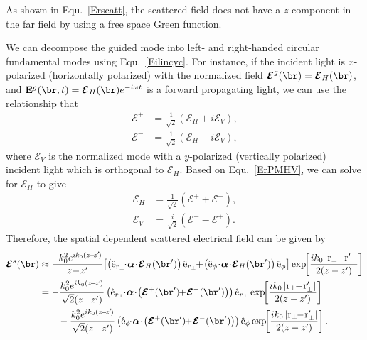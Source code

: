 As shown in Equ.~\ref{Erscatt}, the scattered field does not have a $ z $-component in the far field by using a free space Green function. 

We can decompose the guided mode into left- and right-handed circular fundamental modes using Equ.~\ref{Eilincyc}. For instance, if the incident light is $ x $-polarized (horizontally polarized) with the normalized field $ \boldsymbol{\mathcal{E}}^g (\br)=\boldsymbol{\mathcal{E}}_H (\br) $, and $ \mathbf{E}^g (\br,t) = \boldsymbol{\mathcal{E}}_H(\br)e^{-i\omega t} $ is a forward propagating light, we can use the relationship that
\begin{subequations}
\label{ErPMHV}
\begin{align}
\boldsymbol{\mathcal{E}}^+ &= \frac{1}{\sqrt{2}} \left(\boldsymbol{\mathcal{E}}_H+i\boldsymbol{\mathcal{E}}_V \right),\\
\boldsymbol{\mathcal{E}}^- &= \frac{1}{\sqrt{2}} \left( \boldsymbol{\mathcal{E}}_H-i\boldsymbol{\mathcal{E}}_V \right),
\end{align}
\end{subequations}
where $ \boldsymbol{\mathcal{E}}_V $ is the normalized mode with a $ y $-polarized (vertically polarized) incident light which is orthogonal to $ \boldsymbol{\mathcal{E}}_H $. Based on Equ.~\ref{ErPMHV}, we can solve for $ \boldsymbol{\mathcal{E}}_H $ to give
\begin{align}
\boldsymbol{\mathcal{E}}_H &= \frac{1}{\sqrt{2}} \left(\boldsymbol{\mathcal{E}}^+ + \boldsymbol{\mathcal{E}}^- \right),\\
\boldsymbol{\mathcal{E}}_V &= \frac{i}{\sqrt{2}} \left( \boldsymbol{\mathcal{E}}^- -\boldsymbol{\mathcal{E}}^+ \right). 
\end{align}
Therefore, the spatial dependent scattered electrical field can be given by
\begin{align}
\boldsymbol{\mathcal{E}}^s(\br) &\approx  \frac{-\!k_0^2 e^{ik_0(z\!-\!z'\!)}}{z\!-\!z'}\! \left[\left(\hat{\mathrm{e}}_{r_\perp} \!\!\cdot\! \boldsymbol{\alpha}\!\cdot\! \boldsymbol{\mathcal{E}}_H(\br')\right)\hat{\mathrm{e}}_{r_\perp} \!\!  +\! \left(\hat{\mathrm{e}}_\phi\!\cdot\! \boldsymbol{\alpha}\!\cdot\! \boldsymbol{\mathcal{E}}_H(\br') \right)\hat{\mathrm{e}}_\phi \right] \exp\!\! \left[ \frac{ik_0 \left| \mathrm{r}_\perp\!\! -\! \mathrm{r}_\perp'\right|}{2(z-z')}  \right]\\
&= - \frac{k_0^2 e^{ik_0(z\!-\!z'\!)}}{\sqrt{2}(z\!-\!z')} \left(\hat{\mathrm{e}}_{r_\perp} \!\!\cdot\! \boldsymbol{\alpha}\!\cdot\! \left(\boldsymbol{\mathcal{E}}^+ (\br') \!\! +\! \boldsymbol{\mathcal{E}}^- (\br') \right)\right)\hat{\mathrm{e}}_{r_\perp}  \exp\!\! \left[ \frac{ik_0 \left| \mathrm{r}_\perp\!\! -\! \mathrm{r}_\perp'\right|}{2(z-z')}  \right] \nonumber\\
&\qquad - \frac{k_0^2 e^{ik_0(z\!-\!z'\!)}}{\sqrt{2}(z\!-\!z')} \left(\hat{\mathrm{e}}_{\phi} \!\!\cdot\! \boldsymbol{\alpha}\!\cdot\! \left(\boldsymbol{\mathcal{E}}^+ (\br') \!\! +\! \boldsymbol{\mathcal{E}}^- (\br') \right)\right)\hat{\mathrm{e}}_{\phi}  \exp\!\! \left[ \frac{ik_0 \left| \mathrm{r}_\perp\!\! -\! \mathrm{r}_\perp'\right|}{2(z-z')}  \right]. \label{Ers0}
\end{align}
